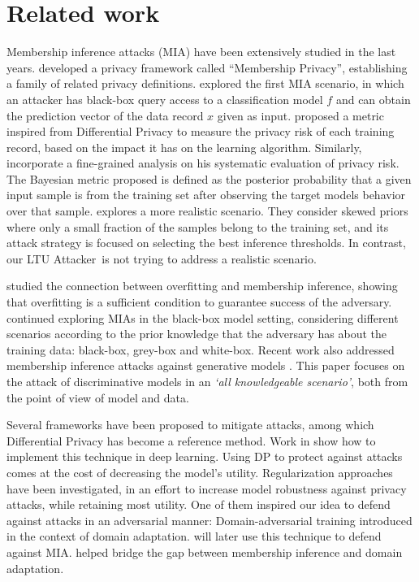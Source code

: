 \documentclass[letterpaper]{article}
\newcommand{\oracle}{LTU Attacker~}
\begin{document}
\section{Related work}
Membership inference attacks (MIA) have been extensively studied in the last years. \cite{li2013membership} developed a privacy framework called ``Membership Privacy'', establishing a family of related privacy definitions. \cite{shokri2017membership} explored the first MIA scenario, in which an attacker has black-box query access to a classification model $f$ and can obtain the prediction vector of the data record $x$ given as input. \cite{long2017towards} proposed a metric inspired from Differential Privacy to measure the privacy risk of each training record, based on the impact it has on the learning algorithm.
Similarly, \cite{song2021systematic} incorporate a fine-grained analysis on his systematic evaluation of privacy risk. The Bayesian metric proposed is defined as the posterior probability that a given input sample is from the training set after observing the target models behavior over that sample. \cite{jayaraman2020revisiting} explores a more realistic scenario. They consider skewed priors where only a small fraction of the samples belong to the training set, and its attack strategy is focused on selecting the best inference thresholds. In contrast, our \oracle is not trying to address a realistic scenario.

\cite{yeom2018privacy} studied the connection between overfitting and membership inference, showing that overfitting is a sufficient condition to guarantee success of the adversary. \cite{truex2019demystifying} continued exploring MIAs in the black-box model setting, considering different scenarios according to the prior knowledge that the adversary has about the training data: black-box, grey-box and white-box. Recent work also addressed membership inference attacks against generative models \cite{hayes2018logan,hilprecht2019reconstruction,chen2020gan}.
This paper focuses on the attack of discriminative models in an {\em `all knowledgeable scenario'}, both from the point of view of model and data.

Several frameworks have been proposed to mitigate attacks, among which
Differential Privacy \cite{dwork2006calibrating} has become a reference method. Work in \cite{abadi2016deep,xie2018differentially} show how to implement this technique in deep learning. Using DP to protect against attacks comes at the cost of decreasing the model's utility.
Regularization approaches have been investigated, in an effort to increase model robustness against privacy attacks, while retaining most utility.
One of them inspired our idea to defend against attacks in an adversarial manner: Domain-adversarial training \cite{ganin2016domain} introduced in the context of domain adaptation. \cite{nasr2018machine} will later use this technique to defend against MIA. \cite{huang2021damia} helped bridge the gap between membership inference and domain adaptation.
\end{document}

